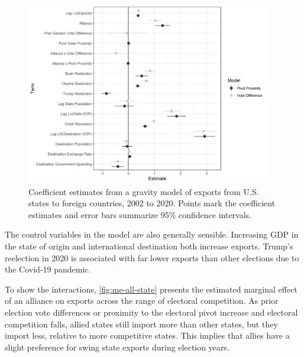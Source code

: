 \documentclass[12pt]{article}
\begin{document}
\begin{figure}[htpb]
	\centering
		\includegraphics[width=0.95\textwidth]{../figures/state-model-coefs.png}
	\caption{Coefficient estimates from a gravity model of exports from U.S. states to foreign countries, 2002 to 2020. Points mark the coefficient estimates and error bars summarize 95\% confidence intervals.}
	\label{fig:state-model-coefs}
\end{figure}


The control variables in the model are also generally sensible. 
Increasing GDP in the state of origin and international destination both increase exports. 
Trump's reelection in 2020 is associated with far lower exports than other elections due to the Covid-19 pandemic. 


To show the interactions, \autoref{fig:me-all-state} presents the estimated marginal effect of an alliance on exports across the range of electoral competition. 
As prior election vote differences or proximity to the electoral pivot increase and electoral competition falls, allied states still import more than other states, but they import less, relative to more competitive states. 
This implies that allies have a slight preference for swing state exports during election years. 
\end{document}
